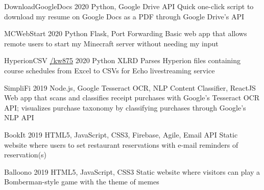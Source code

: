 

\begin{cvprojects}
  \cvproject
  {DownloadGoogleDocs} %
  {\href{https://github.com/KevinIsMyName/DownloadGoogleDocs}{\faGithubSquare\acvHeaderIconSep\@KevinIsMyName}} %
  {2020} %
  {Python, Google Drive API} %
  {Quick one-click script to download my resume on Google Docs as a PDF through Google Drive's API}

  \cvproject
  {MCWebStart} %
  {\href{https://github.com/KevinIsMyName/MCWebStart}{\faGithubSquare\acvHeaderIconSep\@KevinIsMyName}} %
  {2020} %
  {Python Flask, Port Forwarding} %
  {Basic web app that allows remote users to start my Minecraft server without needing my input}

  \cvproject
  {HyperionCSV}
  {\href{https://github.com/KevinIsMyName/HyperionCSV}{\faGithubSquare\acvHeaderIconSep\@KevinIsMyName/kw875}}
  {2020}
  {Python XLRD}
  {Parses Hyperion files containing course schedules from Excel to CSVs for Echo livestreaming service}

  \cvproject
  {SimpliFi}
  {\href{https://github.com/unitehenry/simply-finance}{\faGithubSquare\acvHeaderIconSep{}}}
  {2019}
  {Node.js, Google Tesseract OCR, NLP Content Classifier, ReactJS}
  {Web app that scans and classifies receipt purchases with Google’s Tesseract OCR API; visualizes purchase taxonomy by classifying purchases through Google's NLP API}

  \cvproject
  {BookIt}
  {\href{https://github.com/KevinIsMyName/BookIt}{\faGithubSquare\acvHeaderIconSep{}}}
  {2019}
  {HTML5, JavaScript, CSS3, Firebase, Agile, Email API}
  {Static website where users to set restaurant reservations with e-mail reminders of reservation(s)}

  \cvproject
  {Balloono}
  {\href{https://github.com/KevinIsMyName/Balloono}{\faGithubSquare\acvHeaderIconSep\@KevinIsMyName}}
  {2019}
  {HTML5, JavaScript, CSS3}
  {Static website where visitors can play a Bomberman-style game with the theme of memes}
\end{cvprojects}